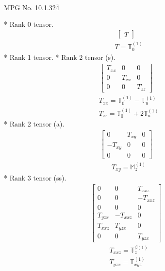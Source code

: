 \documentclass[fleqn,8pt,landscape]{jsarticle}
\begin{document}
\setcounter{MaxMatrixCols}{32}

\renewcommand{\tablename}{Table~}
\renewcommand{\figurename}{Figure~}
\begin{center}
\LARGE
MPG No. 10.1.32\quad$\bar{4}$
\end{center}
* Rank 0 tensor.
\begin{align*}
\begin{bmatrix} T \end{bmatrix}
\end{align*}
\begin{align*}
& T = \mathbb{T}_{0}^{(1)}
\end{align*}
* Rank 1 tensor.
* Rank 2 tensor (s).
\begin{align*}
\begin{bmatrix} T_{xx} & 0 & 0 \\ 0 & T_{xx} & 0 \\ 0 & 0 & T_{zz} \end{bmatrix}
\end{align*}
\begin{align*}
& T_{xx} = \mathbb{T}_{0}^{(1)} - \mathbb{T}_{u}^{(1)} \\
& T_{zz} = \mathbb{T}_{0}^{(1)} + 2 \mathbb{T}_{u}^{(1)}
\end{align*}
* Rank 2 tensor (a).
\begin{align*}
\begin{bmatrix} 0 & T_{xy} & 0 \\ - T_{xy} & 0 & 0 \\ 0 & 0 & 0 \end{bmatrix}
\end{align*}
\begin{align*}
& T_{xy} = \mathbb{M}_{z}^{(1)}
\end{align*}
* Rank 3 tensor (ss).
\begin{align*}
\begin{bmatrix} 0 & 0 & T_{xxz} \\ 0 & 0 & - T_{xxz} \\ 0 & 0 & 0 \\ T_{yzx} & - T_{xxz} & 0 \\ T_{xxz} & T_{yzx} & 0 \\ 0 & 0 & T_{yzx} \end{bmatrix}
\end{align*}
\begin{align*}
& T_{xxz} = \mathbb{T}_{z}^{\beta(1)} \\
& T_{yzx} = \mathbb{T}_{xyz}^{(1)}
\end{align*}
\end{document}
